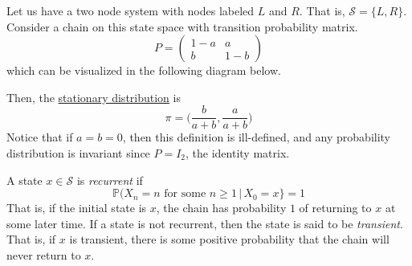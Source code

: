   \begin{example}
    \label{ex:a-two-state-chain}
    Let us have a two node system with nodes labeled $L$ and $R$. That is, $\mathcal{S} = \{L, R\}$. Consider a chain on this state space with transition probability matrix. 
    \begin{equation}
      P = \begin{pmatrix}
      1-a & a \\ b & 1-b 
      \end{pmatrix}
    \end{equation}
    which can be visualized in the following diagram below.
    \begin{center}
    \end{center}

    Then, the \hyperref[def:stationary-distribution]{stationary distribution} is 
    \begin{equation}
      \pi = \Big( \frac{b}{a+b}, \frac{a}{a+b} \Big)
    \end{equation}
    Notice that if $a = b = 0$, then this definition is ill-defined, and any probability distribution is invariant since $P = I_2$, the identity matrix. 
  \end{example}

  \begin{definition}[Recurrent]
    \label{def:recurrent}
    A state $x \in \mathcal{S}$ is \textit{recurrent} if
    \begin{equation}
      \mathbb{P}(X_n = n \text{ for some } n \geq 1 \, | \, X_0 = x\} = 1
    \end{equation}
    That is, if the initial state is $x$, the chain has probability $1$ of returning to $x$ at some later time. If a state is not recurrent, then the state is said to be \textit{transient}. That is, if $x$ is transient, there is some positive probability that the chain will never return to $x$. 
  \end{definition}

